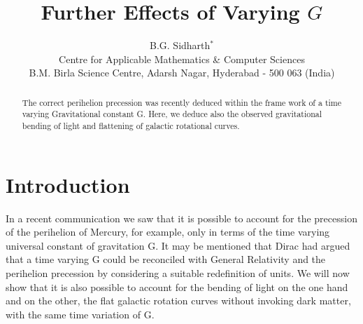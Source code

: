 
\title{Further Effects of Varying $G$}
\author{B.G. Sidharth$^*$\\
Centre for Applicable Mathematics \& Computer Sciences\\
B.M. Birla Science Centre, Adarsh Nagar, Hyderabad - 500 063 (India)}
\date{}
\maketitle
{}
\begin{abstract}
The correct perihelion precession was recently deduced within the frame work
of a time varying Gravitational constant G. Here, we deduce also the
observed gravitational bending of light and flattening of galactic
rotational curves.
\end{abstract}
\section{Introduction}
In a recent communication\cite{r1} we saw that it is possible to account for
the precession of the perihelion of Mercury, for example, only in terms of
the time varying universal constant of gravitation G. It may be mentioned
that Dirac had argued\cite{r2} that a time varying G could be reconciled
with General Relativity and the perihelion precession by considering a suitable
redefinition of units. We will now show that it is also possible to account for the bending
of light on the one hand and on the other, the flat galactic rotation curves
without invoking dark matter, with the same time variation of G.\\
